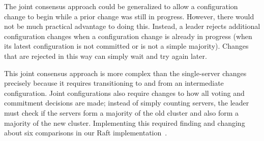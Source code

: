 The joint consensus approach could be generalized to allow a
configuration change to begin while a prior change was still in
progress. However, there would not be much practical advantage to doing
this. Instead, a leader rejects additional configuration changes when a
configuration change is already in progress (when its latest
configuration is not committed or is not a simple majority). Changes
that are rejected in this way can simply wait and try again later.

This joint consensus approach is more complex than the single-server
changes precisely because it requires transitioning to and from an
intermediate configuration. Joint configurations also require changes to
how all voting and commitment decisions are made; instead of simply
counting servers, the leader must check if the servers form a majority
of the old cluster and also form a majority of the new cluster.
Implementing this required finding and changing about six comparisons in
our Raft implementation~\cite{logcabin}.
